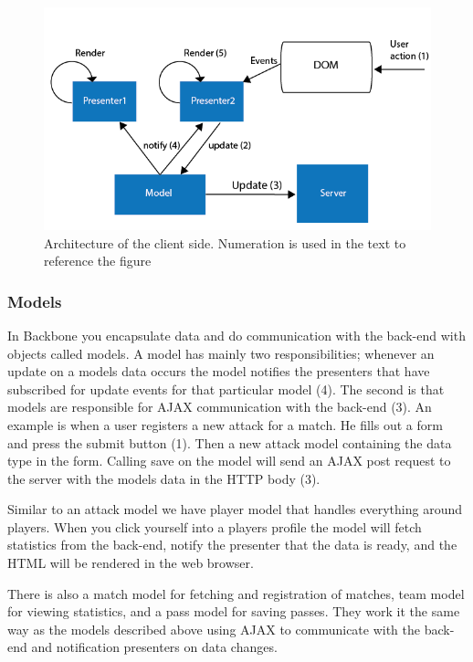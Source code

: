 
\begin{figure}[ht!]
\centering
\includegraphics[width=1\textwidth]{images/architecture/backbone_architecture.png}
\caption{Architecture of the client side. Numeration is used in the text to reference the figure}
\label{fig:backbone_architecture}
\end{figure}

\subsubsection{Models}

In Backbone you encapsulate data and do communication with the back-end with objects called models. A model has mainly two responsibilities; whenever an update on a models data occurs the model notifies the presenters that have subscribed for update events for that particular model (4). The second is that models are responsible for \ac{AJAX} communication with the back-end (3). An example is when a user registers a new attack for a match. He fills out a form and press the submit button (1). Then a new attack model containing the data type in the form. Calling save on the  model will send an \ac{AJAX} post request to the server with the models data in the \ac{HTTP} body (3).

Similar to an attack model we have player model that handles everything around players. When you click yourself into a players profile the model will fetch statistics from the back-end, notify the presenter that the data is ready, and the \ac{HTML} will be rendered in the web browser.

There is also a match model for fetching and registration of matches, team model for viewing statistics, and a pass model for saving passes. They work it the same way as the models described above using \ac{AJAX} to communicate with the back-end and notification presenters on data changes.

